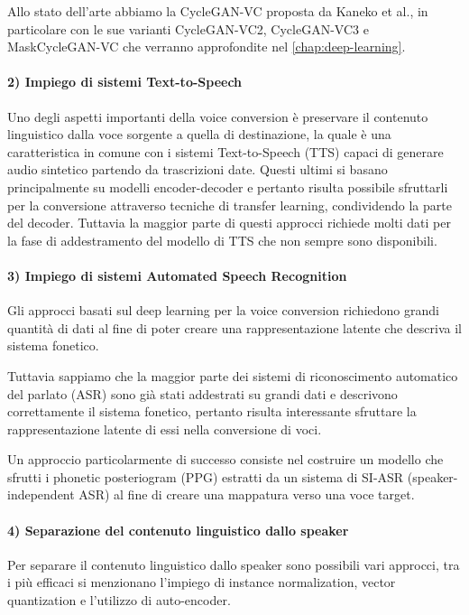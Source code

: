 			Allo stato dell'arte abbiamo la CycleGAN-VC\cite{CycleGAN2017} proposta da Kaneko et al., in particolare con le sue varianti CycleGAN-VC2\cite{CycleGAN-VC2}, CycleGAN-VC3\cite{CycleGAN-VC3} e MaskCycleGAN-VC\cite{MaskCyclegan-VC} che verranno approfondite nel \autoref{chap:deep-learning}.
			
			\paragraph{2) Impiego di sistemi Text-to-Speech}
			Uno degli aspetti importanti della voice conversion è preservare il contenuto linguistico dalla voce sorgente a quella di destinazione, la quale è una caratteristica in comune con i sistemi Text-to-Speech (TTS) capaci di generare audio sintetico partendo da trascrizioni date. Questi ultimi si basano principalmente su modelli encoder-decoder e pertanto risulta possibile sfruttarli per la conversione attraverso tecniche di transfer learning\cite{transfer-learning-tts-vc}, condividendo la parte del decoder. Tuttavia la maggior parte di questi approcci richiede molti dati per la fase di addestramento del modello di TTS che non sempre sono disponibili.
			
			\paragraph{3) Impiego di sistemi Automated Speech Recognition}
			Gli approcci basati sul deep learning per la voice conversion richiedono grandi quantità di dati al fine di poter creare una rappresentazione latente che descriva il sistema fonetico.
			
			Tuttavia sappiamo che la maggior parte dei sistemi di riconoscimento automatico del parlato (ASR) sono già stati addestrati su grandi dati e descrivono correttamente il sistema fonetico, pertanto risulta interessante sfruttare la rappresentazione latente di essi nella conversione di voci.
			
			Un approccio particolarmente di successo consiste nel costruire un modello che sfrutti i phonetic posteriogram (PPG) estratti da un sistema di SI-ASR (speaker-independent ASR) al fine di creare una mappatura verso una voce target\cite{ppg-vc}.
			
			\paragraph{4) Separazione del contenuto linguistico dallo speaker}
			Per separare il contenuto linguistico dallo speaker sono possibili vari approcci, tra i più efficaci si menzionano l'impiego di instance normalization\cite{instance-normalization}, vector quantization\cite{vector-quantization} e l'utilizzo di auto-encoder\cite{auto-encoder}.
			
